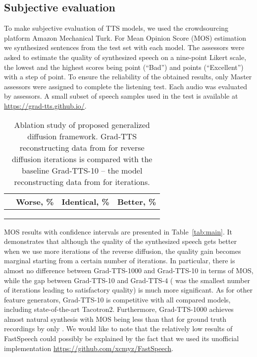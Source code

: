 \documentclass{article}
\begin{document}
\subsection{Subjective evaluation}
\label{subsec:subj}
To make subjective evaluation of TTS models, we used the crowdsourcing platform Amazon Mechanical Turk. For Mean Opinion Score (MOS) estimation we synthesized  sentences from the test set with each model. The assessors were asked to estimate the quality of synthesized speech on a nine-point Likert scale, the lowest and the highest scores being  point (``Bad'') and  points (``Excellent'') with a step of  point. To ensure the reliability of the obtained results, only Master assessors were assigned to complete the listening test. Each audio was evaluated by  assessors. A small subset of speech samples used in the test is available at \url{https://grad-tts.github.io/}.

\begin{table}[H]
\caption{Ablation study of proposed generalized diffusion framework. Grad-TTS reconstructing data from  for  reverse diffusion iterations is compared with the baseline Grad-TTS-10 -- the model reconstructing data from  for  iterations.}
\begin{center}
\begin{tabular}{|c|c|c|c|}
\hline
 &Worse, \% &Identical, \% &Better, \% \\ \hline
 & & & \\ \hline
 & & & \\ \hline
 & & & \\ \hline
\end{tabular}
\end{center}
\label{tab:preference_test}
\end{table}

MOS results with  confidence intervals are presented in Table~\ref{tab:main}. It demonstrates that although the quality of the synthesized speech gets better when we use more iterations of the reverse diffusion, the quality gain becomes marginal starting from a certain number of iterations. In particular, there is almost no difference between Grad-TTS-1000 and Grad-TTS-10 in terms of MOS, while the gap between Grad-TTS-10 and Grad-TTS-4 ( was the smallest number of iterations leading to satisfactory quality) is much more significant. As for other feature generators, Grad-TTS-10 is competitive with all compared models, including state-of-the-art Tacotron2. Furthermore, Grad-TTS-1000 achieves almost natural synthesis with MOS being less than that for ground truth recordings by only . We would like to note that the relatively low results of FastSpeech could possibly be explained by the fact that we used its unofficial implementation \url{https://github.com/xcmyz/FastSpeech}.
\end{document}
